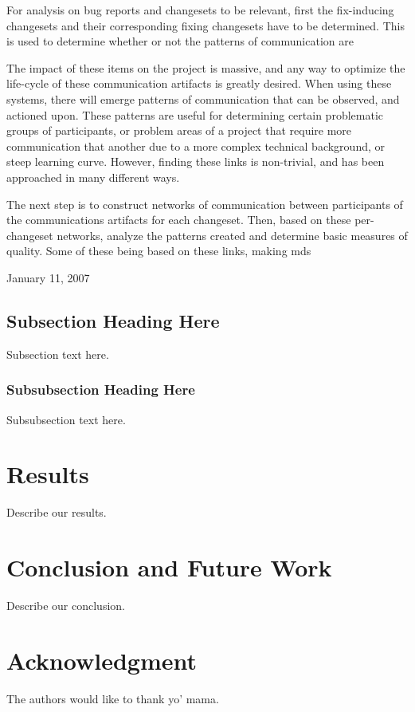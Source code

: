 \documentclass[conference]{IEEEtran}
\begin{document}
For analysis on bug reports and changesets to be relevant, first the fix-inducing changesets\cite{Sliwerski:2005:CIF:1083142.1083147} and their corresponding fixing changesets have to be determined.  This is used to determine whether or not the patterns of communication are 

The impact of these items on the project is massive, and any way to optimize the life-cycle of these communication artifacts is greatly desired.  When using these systems, there will emerge patterns of communication that can be observed, and actioned upon.  These patterns are useful for determining certain problematic groups of participants, or problem areas of a project that require more communication that another due to a more complex technical background, or steep learning curve.  However, finding these links is non-trivial, and has been approached in many different ways.


The next step is to construct networks of communication between participants of the communications artifacts for each changeset.  Then, based on these per-changeset networks, analyze the patterns created and determine basic measures of quality.  Some of these being based on these links, making  
\hfill mds
 
\hfill January 11, 2007

\subsection{Subsection Heading Here}
Subsection text here.

\subsubsection{Subsubsection Heading Here}
Subsubsection text here.


\section{Results}
Describe our results.


\section{Conclusion and Future Work}
Describe our conclusion.


\section*{Acknowledgment}
The authors would like to thank yo' mama.






\end{document}
